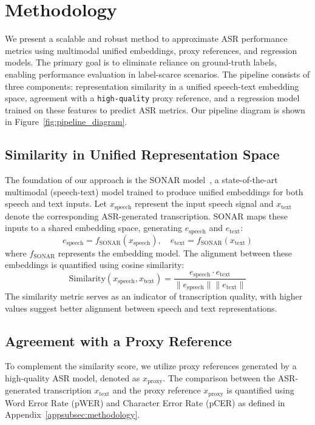 
\section{Methodology}\label{sec:methodology}


We present a scalable and robust method to approximate ASR performance metrics using multimodal unified embeddings, proxy references, and regression models. The primary goal is to eliminate reliance on ground-truth labels, enabling performance evaluation in label-scarce scenarios. The pipeline consists of three components: representation similarity in a unified speech-text embedding space, agreement with a \texttt{high-quality} proxy reference, and a regression model trained on these features to predict ASR metrics. Our pipeline diagram is shown in Figure~\ref{fig:pipeline_diagram}.


\subsection{Similarity in Unified Representation Space}
The foundation of our approach is the SONAR model~\cite{duquenne2023sonar}, a state-of-the-art multimodal (speech-text) model trained to produce unified embeddings for both speech and text inputs. Let $x_{\text{speech}}$ represent the input speech signal and $x_{\text{text}}$ denote the corresponding ASR-generated transcription. SONAR maps these inputs to a shared embedding space, generating $e_{\text{speech}}$ and $e_{\text{text}}$:
\begin{equation}
    e_{\text{speech}} = f_{\text{SONAR}}(x_{\text{speech}}),\quad e_{\text{text}} = f_{\text{SONAR}}(x_{\text{text}})
\end{equation}
where $f_{\text{SONAR}}$ represents the embedding model. The alignment between these embeddings is quantified using cosine similarity:
\begin{equation}
    \text{Similarity}(x_{\text{speech}}, x_{\text{text}}) = \frac{e_{\text{speech}} \cdot e_{\text{text}}}{\|e_{\text{speech}}\| \|e_{\text{text}}\|}
\end{equation}
The similarity metric serves as an indicator of transcription quality, with higher values suggest better alignment between speech and text representations.


\subsection{Agreement with a Proxy Reference}
To complement the similarity score, we utilize proxy references generated by a high-quality ASR model, denoted as $x_{\text{proxy}}$. The comparison between the ASR-generated transcription $x_{\text{text}}$ and the proxy reference $x_{\text{proxy}}$ is quantified using Word Error Rate (pWER) and Character Error Rate (pCER) as defined in Appendix~\ref{appsubsec:methodology}.

